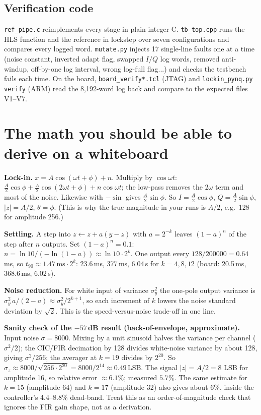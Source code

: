 \documentclass[10pt,a4paper]{article}
\renewcommand{\c}[1]{\texttt{#1}}
\begin{document}
\subsection{Verification code}
\c{ref\_pipe.c} reimplements every stage in plain integer C. \c{tb\_top.cpp} runs the HLS function and the reference in lockstep over seven configurations and compares every logged word. \c{mutate.py} injects 17 single-line faults one at a time (noise constant, inverted adapt flag, swapped $I/Q$ log words, removed anti-windup, off-by-one log interval, wrong log-full flag...) and checks the testbench fails each time. On the board, \c{board\_verify*.tcl} (JTAG) and \c{lockin\_pynq.py verify} (ARM) read the 8,192-word log back and compare to the expected files V1--V7.

\section{The math you should be able to derive on a whiteboard}
\textbf{Lock-in.} $x=A\cos(\omega t+\phi)+n$. Multiply by $\cos\omega t$: $\tfrac A2\cos\phi+\tfrac A2\cos(2\omega t+\phi)+n\cos\omega t$; the low-pass removes the $2\omega$ term and most of the noise. Likewise with $-\sin$ gives $\tfrac A2\sin\phi$. So $I=\tfrac A2\cos\phi$, $Q=\tfrac A2\sin\phi$, $|z|=A/2$, $\theta=\phi$. (This is why the true magnitude in your runs is $A/2$, e.g.\ 128 for amplitude 256.)

\textbf{Settling.} A step into $z\leftarrow z+a(y-z)$ with $a=2^{-k}$ leaves $(1-a)^n$ of the step after $n$ outputs. Set $(1-a)^n=0.1$: $n=\ln10/(-\ln(1-a))\approx\ln10\cdot2^k$. One output every $128/200000=0.64$\,ms, so $t_{90}\approx1.47\,\mathrm{ms}\cdot2^k$: 23.6\,ms, 377\,ms, 6.04\,s for $k=4,8,12$ (board: 20.5\,ms, 368.6\,ms, 6.02\,s).

\textbf{Noise reduction.} For white input of variance $\sigma_y^2$ the one-pole output variance is $\sigma_y^2\,a/(2-a)\approx\sigma_y^2/2^{k+1}$, so each increment of $k$ lowers the noise standard deviation by $\sqrt2$. This is the speed-versus-noise trade-off in one line.

\textbf{Sanity check of the $-57$\,dB result (back-of-envelope, approximate).} Input noise $\sigma=8000$. Mixing by a unit sinusoid halves the variance per channel ($\sigma^2/2$); the CIC/FIR decimation by 128 divides white-noise variance by about 128, giving $\sigma^2/256$; the averager at $k=19$ divides by $2^{20}$. So $\sigma_z\approx8000/\sqrt{256\cdot2^{20}}=8000/2^{14}\approx0.49$\,LSB. The signal $|z|=A/2=8$ LSB for amplitude 16, so relative error $\approx6.1\%$; measured $5.7\%$. The same estimate for $k=15$ (amplitude 64) and $k=17$ (amplitude 32) also gives about 6\%, inside the controller's 4.4--8.8\% dead-band. Treat this as an order-of-magnitude check that ignores the FIR gain shape, not as a derivation.
\end{document}
